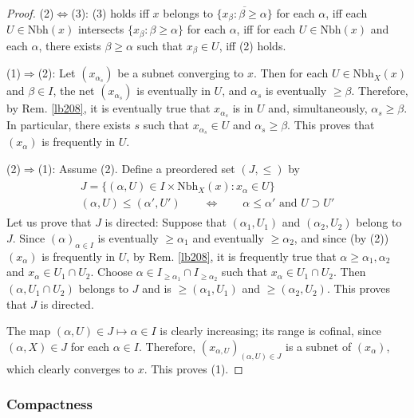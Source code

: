 \documentclass[12pt,b5paper,notitlepage]{article}
\theoremstyle{definition}
\theoremstyle{plain}
\newcommand{\ovl}{\overline}
\newcommand{\Nbh}{\mathrm{Nbh}}
\numberwithin{equation}{section}
\begin{document}
\begin{proof}
(2)$\Leftrightarrow$(3): (3) holds iff $x$ belongs to $\ovl{\{x_\beta:\beta\geq\alpha\}}$ for each $\alpha$, iff each $U\in\Nbh(x)$ intersects $\{x_\beta:\beta\geq\alpha\}$ for each $\alpha$, iff for each $U\in\Nbh(x)$ and each $\alpha$, there exists $\beta\geq\alpha$ such that $x_\beta\in U$, iff (2) holds.

(1)$\Rightarrow$(2): Let $(x_{\alpha_s})$ be a subnet converging to $x$. Then for each $U\in\Nbh_X(x)$ and $\beta\in I$, the net $(x_{\alpha_s})$ is eventually in $U$, and $\alpha_s$ is eventually $\geq\beta$. Therefore, by Rem. \ref{lb208}, it is eventually true that $x_{\alpha_s}$ is in $U$ and, simultaneously,  $\alpha_s\geq\beta$. In particular, there exists $s$ such that $x_{\alpha_s}\in U$ and $\alpha_s\geq\beta$. This proves that $(x_\alpha)$ is frequently in $U$.

(2)$\Rightarrow$(1): Assume (2). Define a preordered set $(J,\leq)$ by
\begin{gather}
\begin{gathered}
J=\{(\alpha,U)\in I\times\Nbh_X(x):x_\alpha\in U \}\\[0.5ex]
(\alpha,U)\leq (\alpha',U')\qquad\Longleftrightarrow\qquad \alpha\leq \alpha'\text{ and }U\supset U'
\end{gathered}
\end{gather}
Let us prove that $J$ is directed: Suppose that $(\alpha_1,U_1)$ and $(\alpha_2,U_2)$ belong to $J$. Since $(\alpha)_{\alpha\in I}$ is eventually $\geq\alpha_1$ and eventually $\geq\alpha_2$, and since (by (2)) $(x_\alpha)$ is frequently in $U$, by Rem. \ref{lb208}, it is frequently true that $\alpha\geq\alpha_1,\alpha_2$ and $x_\alpha\in U_1\cap U_2$. Choose $\alpha\in I_{\geq\alpha_1}\cap I_{\geq\alpha_2}$ such that $x_\alpha\in U_1\cap U_2$. Then $(\alpha,U_1\cap U_2)$ belongs to $J$ and is $\geq(\alpha_1,U_1)$ and $\geq(\alpha_2,U_2)$. This proves that $J$ is directed.


The map $(\alpha,U)\in J\mapsto \alpha\in I$ is clearly increasing; its range is cofinal, since $(\alpha,X)\in J$ for each $\alpha\in I$. Therefore, $(x_{\alpha,U})_{(\alpha,U)\in J}$ is a subnet of $(x_\alpha)$, which clearly converges to $x$. This proves (1).
\end{proof}



\subsubsection{Compactness}
\end{document}
